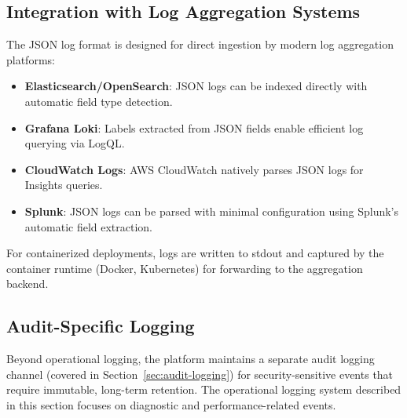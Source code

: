 \subsection{Integration with Log Aggregation Systems}

The JSON log format is designed for direct ingestion by modern log aggregation platforms:

\begin{itemize}
    \item \textbf{Elasticsearch/OpenSearch}: JSON logs can be indexed directly with automatic field type detection.
    
    \item \textbf{Grafana Loki}: Labels extracted from JSON fields enable efficient log querying via LogQL.
    
    \item \textbf{CloudWatch Logs}: AWS CloudWatch natively parses JSON logs for Insights queries.
    
    \item \textbf{Splunk}: JSON logs can be parsed with minimal configuration using Splunk's automatic field extraction.
\end{itemize}

For containerized deployments, logs are written to stdout and captured by the container runtime (Docker, Kubernetes) for forwarding to the aggregation backend.

\subsection{Audit-Specific Logging}

Beyond operational logging, the platform maintains a separate audit logging channel (covered in Section~\ref{sec:audit-logging}) for security-sensitive events that require immutable, long-term retention. The operational logging system described in this section focuses on diagnostic and performance-related events.


